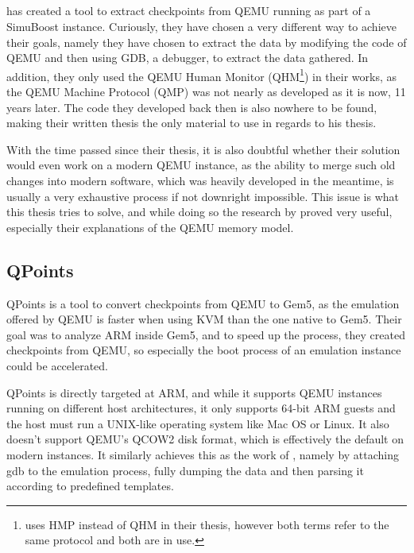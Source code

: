 \subsection{\cite{kitcheckpoints}}
 has created a tool to extract checkpoints from QEMU running as part of a SimuBoost instance.
Curiously, they have chosen a very different way to achieve their goals,
namely they have chosen to extract the data by modifying the code of QEMU and then using GDB,
a debugger, to extract the data gathered.
In addition, they only used the QEMU Human Monitor (QHM\footnote{ uses HMP instead of QHM in their thesis, however both terms refer to the same protocol and both are in use.})
in their works, as the QEMU Machine Protocol (QMP) was not nearly as developed as it is now, 11 years later.
The code they developed back then is also nowhere to be found,
making their written thesis the only material to use in regards to his thesis\cite{kitcheckpoints}.

With the time passed since their thesis,
it is also doubtful whether their solution would even work on a modern QEMU instance,
as the ability to merge such old changes into modern software,
which was heavily developed in the meantime,
is usually a very exhaustive process if not downright impossible.
This issue is what this thesis tries to solve,
and while doing so the research by \citeauthor{kitcheckpoints} proved very useful,
especially their explanations of the QEMU memory model\cite{kitcheckpoints}.

\subsection{QPoints\cite{qpoints}}
QPoints is a tool to convert checkpoints from QEMU to Gem5,
as the emulation offered by QEMU is faster when using KVM than the one native to Gem5.
Their goal was to analyze ARM inside Gem5,
and to speed up the process, they created checkpoints from QEMU,
so especially the boot process of an emulation instance could be accelerated.

QPoints is directly targeted at ARM, and while it supports QEMU instances running on different host architectures,
it only supports 64-bit ARM guests and the host must run a UNIX-like operating system like Mac OS or Linux.
It also doesn't support QEMU's QCOW2 disk format, which is effectively the default on modern instances.
It similarly achieves this as the work of \citeauthor{kitcheckpoints},
namely by attaching gdb to the emulation process, fully dumping the data
and then parsing it according to predefined templates.

